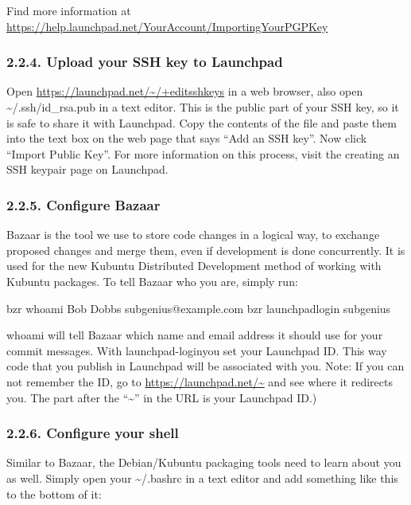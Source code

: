 \documentclass[letterpaper,10pt,english]{sphinxmanual}
\begin{document}
Find more information at \url{https://help.launchpad.net/YourAccount/ImportingYourPGPKey}


\subsubsection{2.2.4. Upload your SSH key to Launchpad}
\label{\detokenize{docs/packaging_guide/getting_started:upload-your-ssh-key-to-launchpad}}
Open \url{https://launchpad.net/~/+editsshkeys} in a web browser, also open \textasciitilde{}/.ssh/id\_rsa.pub in a text editor. This is the public part of your SSH key, so it is safe to share it with Launchpad. Copy the contents of the file and paste them into the text box on the web page that says “Add an SSH key”. Now click “Import Public Key”.
For more information on this process, visit the creating an SSH keypair page on Launchpad.


\subsubsection{2.2.5. Configure Bazaar}
\label{\detokenize{docs/packaging_guide/getting_started:configure-bazaar}}
Bazaar is the tool we use to store code changes in a logical way, to exchange proposed changes and merge them, even if development is done concurrently. It is used for the new Kubuntu Distributed Development method of working with Kubuntu packages.
To tell Bazaar who you are, simply run:

\begin{sphinxVerbatim}[commandchars=\\\{\}]
\PYGZdl{} bzr whoami \PYGZdq{}Bob Dobbs \PYGZlt{}subgenius@example.com\PYGZgt{}\PYGZdq{}
\PYGZdl{} bzr launchpad\PYGZhy{}login subgenius
\end{sphinxVerbatim}

whoami will tell Bazaar which name and email address it should use for your commit messages. With launchpad-loginyou set your Launchpad ID. This way code that you publish in Launchpad will be associated with you.
Note: If you can not remember the ID, go to \url{https://launchpad.net/~} and see where it redirects you. The part after the “\textasciitilde{}” in the URL is your Launchpad ID.)


\subsubsection{2.2.6. Configure your shell}
\label{\detokenize{docs/packaging_guide/getting_started:configure-your-shell}}
Similar to Bazaar, the Debian/Kubuntu packaging tools need to learn about you as well. Simply open your \textasciitilde{}/.bashrc in a text editor and add something like this to the bottom of it:
\end{document}
